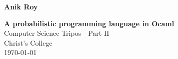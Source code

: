 \documentclass[12pt,notitlepage,a4paper]{report}
\begin{document}

\pagestyle{empty}

\hfill{\LARGE \bf Anik Roy}

\vspace*{\fill}
\begin{center}
	\huge
	\textbf{A probabilistic programming language in Ocaml}\\
	\vspace*{8mm}
	{\LARGE Computer Science Tripos - Part II} \\
	{\LARGE Christ's College} \\
	{\LARGE \today}
\end{center}
\vspace*{\fill}

\cleardoublepage


\setcounter{page}{1}
\pagestyle{plain}




\cleardoublepage        %

\setcounter{page}{1}
\pagestyle{headings}














\appendix




\end{document}
